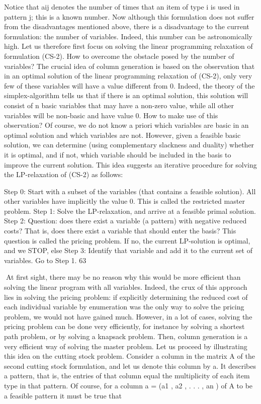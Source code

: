Notice that aij denotes the number of times that an item of type i is used in pattern j; this is a known
number. Now although this formulation does not suffer from the disadvantages mentioned above, there
is a disadvantage to the current formulation: the number of variables. Indeed, this number can be
astronomically high.
Let us therefore first focus on solving the linear programming relaxation of formulation (CS-2). How to
overcome the obstacle posed by the number of variables? The crucial idea of column generation is based
on the observation that in an optimal solution of the linear programming relaxation of (CS-2), only very
few of these variables will have a value different from 0. Indeed, the theory of the simplex-algorithm
tells us that if there is an optimal solution, this solution will consist of n basic variables that may have
a non-zero value, while all other variables will be non-basic and have value 0.
How to make use of this observation? Of course, we do not know a priori which variables are basic in an
optimal solution and which variables are not. However, given a feasible basic solution, we can determine
(using complementary slackness and duality) whether it is optimal, and if not, which variable should
be included in the basis to improve the current solution. This idea suggests an iterative procedure for
solving the LP-relaxation of (CS-2) as follows:

Step 0: Start with a subset of the variables (that contains a feasible solution). All other variables have
implicitly the value 0. This is called the restricted master problem.
Step 1: Solve the LP-relaxation, and arrive at a feasible primal solution.
Step 2: Question: does there exist a variable (a pattern) with negative reduced costs? That is, does there
exist a variable that should enter the basis? This question is called the pricing problem. If no, the
current LP-solution is optimal, and we STOP, else
Step 3: Identify that variable and add it to the current set of variables. Go to Step 1.
63

At first sight, there may be no reason why this would be more efficient than solving the linear program
with all variables. Indeed, the crux of this approach lies in solving the pricing problem: if explicitly
determining the reduced cost of each individual variable by enumeration was the only way to solve the
pricing problem, we would not have gained much. However, in a lot of cases, solving the pricing problem
can be done very efficiently, for instance by solving a shortest path problem, or by solving a knapsack
problem. Then, column generation is a very efficient way of solving the master problem. Let us proceed
by illustrating this idea on the cutting stock problem.
Consider a column in the matrix A of the second cutting stock formulation, and let us denote this
column by a. It describes a pattern, that is, the entries of that column equal the multiplicity of each
item type in that pattern. Of course, for a column a = (a1 , a2 , . . . , an ) of A to be a feasible pattern it
must be true that

